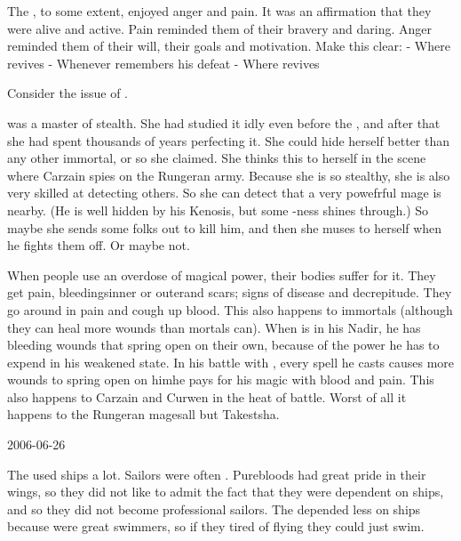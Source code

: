 The \resphain, to some extent, enjoyed anger and pain.
It was an affirmation that they were alive and active.
Pain reminded them of their bravery and daring.
Anger reminded them of their will, their goals and motivation.
Make this clear:
- Where \Teshrial revives
- Whenever \Teshrial remembers his defeat 
- Where \Urizeth revives

Consider the issue of \dragonic {}. 

\Nzessuacrith was a master of stealth.
She had studied it idly even before the \secondbanewar, and after that she had spent thousands of years perfecting it. 
She could hide herself better than any other immortal, or so she claimed.
She thinks this to herself in the scene where Carzain spies on the Rungeran army.
Because she is so stealthy, she is also very skilled at detecting others.
So she can detect that a very powefrful mage is nearby.
(He is well hidden by his Kenosis, but some \vertex-ness shines through.)
So maybe she sends some folks out to kill him, and then she muses to herself when he fights them off.
Or maybe not.

When people use an overdose of magical power, their bodies suffer for it.
They get pain, bleedings\dash{}inner or outer\dash{}and scars; signs of disease and decrepitude.
They go around in pain and cough up blood.
This also happens to immortals (although they can heal more wounds than mortals can).
When \Ishnaruchaefir is in his Nadir, he has bleeding wounds that spring open on their own, because of the power he has to expend in his weakened state.
In his battle with \Teshrial, every spell he casts causes more wounds to spring open on him\dash{}he pays for his magic with blood and pain.
This also happens to Carzain and Curwen in the heat of battle.
Worst of all it happens to the Rungeran mages\dash{}all but Takestsha.



2006-06-26

The \resphain used ships a lot.
Sailors were often \bezedeth.
Purebloods had great pride in their wings, so they did not like to admit the fact that they were dependent on ships, and so they did not become professional sailors.
The \dragons depended less on ships because \dragons were great swimmers, so if they tired of flying they could just swim.

